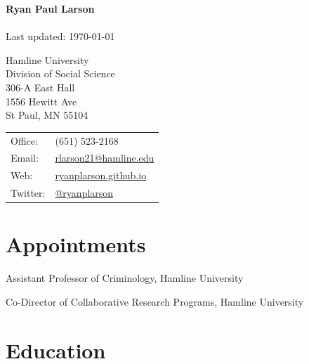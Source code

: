 \documentclass[letterpaper]{article}
\def\name{Ryan Paul Larson}
\newenvironment{publist}{%
  \begin{list}{}{%
    \setlength{\leftmargin}{0cm}   %
    \setlength{\labelwidth}{2cm}     %
    \setlength{\labelsep}{0.5cm}     %
  }%
}{%
  \end{list}%
}
\begin{document}
\textbf{{\huge \name}}\\
\\
Last updated: \today

\vspace{5ex}





\begin{minipage}{0.45\linewidth}
  Hamline University \\
  Division of Social Science \\
  306-A East Hall \\
 1556 Hewitt Ave \\
 St Paul, MN 55104
\end{minipage}
\begin{minipage}{0.45\linewidth}
  \begin{tabular}{ll}
    Office: & (651) 523-2168 \\
    Email: & \href{mailto:rlarson21@hamline.edu}{rlarson21@hamline.edu} \\
    Web: & \href{https://ryanplarson.github.io/personal_site/}{ryanplarson.github.io} \\
   Twitter: &  \href{https://twitter.com/ryanplarson}{@ryanplarson} \\
  \end{tabular}
\end{minipage}



\section*{\textbf{Appointments}}


\begin{publist}

\item[\textbf{2022-present}] Assistant Professor of Criminology, Hamline University

\item[\textbf{2023-present}] Co-Director of Collaborative Research Programs, Hamline University


\end{publist}



\section*{\textbf{Education}}
\end{document}
